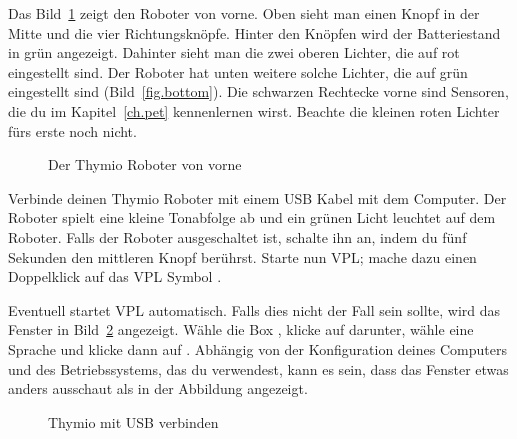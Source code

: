 

Das Bild~\ref{fig.front} zeigt den Roboter von vorne. Oben sieht man einen Knopf in
der Mitte und die vier Richtungsknöpfe. Hinter den Knöpfen wird der
Batteriestand in grün angezeigt. Dahinter sieht man die zwei oberen Lichter, die auf
rot eingestellt sind. Der Roboter hat unten weitere solche Lichter, die auf
grün eingestellt sind (Bild~\ref{fig.bottom}). Die schwarzen Rechtecke vorne
sind Sensoren, die du im Kapitel~\ref{ch.pet} kennenlernen wirst. Beachte die kleinen roten Lichter fürs erste noch nicht.

\begin{figure}
\begin{center}
\caption{Der Thymio Roboter von vorne}\label{fig.front}
\end{center}
\end{figure} 

\pagebreak


Verbinde deinen Thymio Roboter mit einem USB Kabel mit dem Computer. Der
Roboter spielt eine kleine Tonabfolge ab und  ein grünen Licht leuchtet auf dem
Roboter. Falls der Roboter ausgeschaltet ist, schalte ihn an, indem du fünf
Sekunden den mittleren Knopf berührst. Starte nun VPL; mache dazu einen
Doppelklick auf das VPL Symbol . 


Eventuell startet VPL automatisch. Falls dies nicht der Fall sein sollte, wird das
Fenster in Bild~\ref{fig.connect} angezeigt. Wähle die Box
, klicke auf  darunter, wähle eine
Sprache und klicke dann auf .
Abhängig von der
Konfiguration deines Computers und des Betriebssystems, das du verwendest, kann es
sein, dass das Fenster etwas anders ausschaut als in der Abbildung angezeigt.


\begin{figure}
\begin{center}
\caption{Thymio mit USB verbinden}\label{fig.connect}
\end{center}
\end{figure} 

